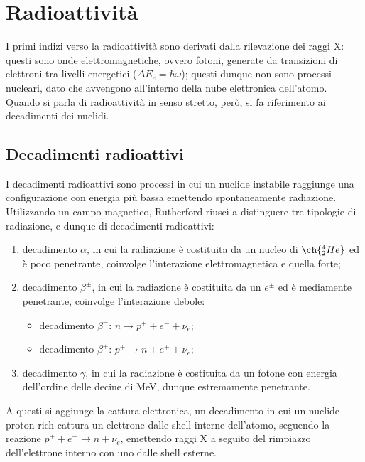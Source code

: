 
\section{Radioattività}

I primi indizi verso la radioattività sono derivati dalla rilevazione dei raggi X: questi sono onde elettromagnetiche, ovvero fotoni, generate da transizioni di elettroni tra livelli energetici ($ \Delta E_e = \hbar \omega $); questi dunque non sono processi nucleari, dato che avvengono all'interno della nube elettronica dell'atomo.\\
Quando si parla di radioattività in senso stretto, però, si fa riferimento ai decadimenti dei nuclidi.

\subsection{Decadimenti radioattivi}

I decadimenti radioattivi sono processi in cui un nuclide instabile raggiunge una configurazione con energia più bassa emettendo spontaneamente radiazione.\\
Utilizzando un campo magnetico, Rutherford riuscì a distinguere tre tipologie di radiazione, e dunque di decadimenti radioattivi:
\begin{enumerate}
  \item decadimento $ \alpha $, in cui la radiazione è costituita da un nucleo di $ \ch{^4_2 He} $ ed è poco penetrante, coinvolge l'interazione elettromagnetica e quella forte;
  \item decadimento $ \beta^{\pm} $, in cui la radiazione è costituita da un $ e^{\pm} $ ed è mediamente penetrante, coinvolge l'interazione debole:
    \begin{itemize}
      \item decadimento $ \beta^- $: $ n \rightarrow p^+ + e^- + \bar{\nu}_e $;
      \item decadimento $ \beta^+ $: $ p^+ \rightarrow n + e^+ + \nu_e $;
    \end{itemize}
  \item decadimento $ \gamma $, in cui la radiazione è costituita da un fotone con energia dell'ordine delle decine di MeV, dunque estremamente penetrante.
\end{enumerate}
A questi si aggiunge la cattura elettronica, un decadimento in cui un nuclide proton-rich cattura un elettrone dalle shell interne dell'atomo, seguendo la reazione $ p^+ + e^- \rightarrow n + \nu_e $, emettendo raggi X a seguito del rimpiazzo dell'elettrone interno con uno dalle shell esterne.

